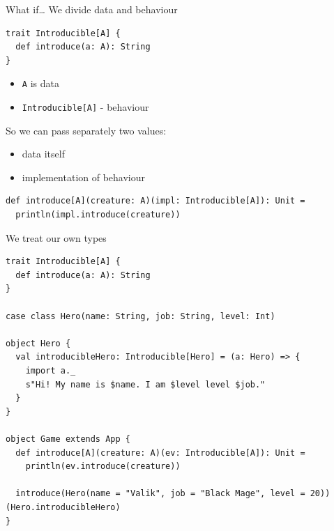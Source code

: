 \documentclass[presentation,aspectratio=169,smaller]{beamer}
\begin{document}
\begin{frame}[label={sec:orge258f59},fragile]{What if\ldots{}}
 We divide data and behaviour

\pause

\begin{verbatim}
trait Introducible[A] {
  def introduce(a: A): String
}
\end{verbatim}

\begin{itemize}
\item \texttt{A} is data
\item \texttt{Introducible[A]} - behaviour
\end{itemize}

\pause

So we can pass separately two values:

\begin{itemize}
\item data itself
\item implementation of behaviour
\end{itemize}

\pause

\begin{verbatim}
def introduce[A](creature: A)(impl: Introducible[A]): Unit =
  println(impl.introduce(creature))
\end{verbatim}
\end{frame}

\begin{frame}[label={sec:org30eda45},fragile]{We treat our own types}
 \begin{verbatim}
trait Introducible[A] {
  def introduce(a: A): String
}

case class Hero(name: String, job: String, level: Int)

object Hero {
  val introducibleHero: Introducible[Hero] = (a: Hero) => {
    import a._
    s"Hi! My name is $name. I am $level level $job."
  }
}

object Game extends App {
  def introduce[A](creature: A)(ev: Introducible[A]): Unit =
    println(ev.introduce(creature))

  introduce(Hero(name = "Valik", job = "Black Mage", level = 20))(Hero.introducibleHero)
}
\end{verbatim}
\end{frame}
\end{document}
